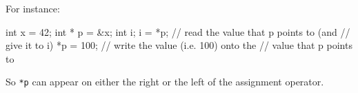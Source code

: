 \begin{ex}
\begin{consolethree}[escapeinside=||]
For instance:

\begin{consolethree}[escapeinside=||]
int x = 42;
int * p = &x;
int i;
i = *p; // read the value that p points to (and
// give it to i)
*p = 100; // write the value (i.e. 100) onto the
// value that p points to
\end{consolethree}


So \texttt{*p} can appear on either the right or the left of the
assignment operator.










\end{consolethree}
\end{ex}
